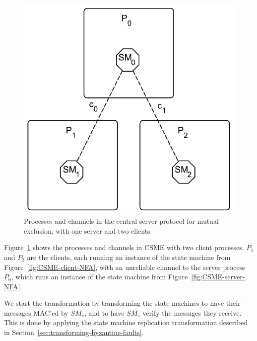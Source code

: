 \documentclass{article}
\begin{document}
		\FloatBarrier
		\begin{figure}[ht!]
			\center
			\includegraphics[scale=0.6]{figures/state-machines/CSME-protocol.pdf}
			\caption{Processes and channels in the central server protocol for mutual exclusion, with one server and two clients.}
			\label{fig:CSME-protocol}
		\end{figure}
		\FloatBarrier

		Figure~\ref{fig:CSME-protocol} shows the processes and channels in CSME with two client processes.
		$P_1$ and $P_2$ are the clients, each running an instance of the state machine from Figure~\ref{fig:CSME-client-NFA}, with an unreliable channel to the server process $P_0$, which runs an instance of the state machine from Figure~\ref{fig:CSME-server-NFA}.

		We start the transformation by transforming the state machines to have their messages MAC'ed by $SM_s$, and to have $SM_s$ verify the messages they receive.
		This is done by applying the state machine replication transformation described in Section~\ref{sec:transforming-byzantine-faults}.
\end{document}
